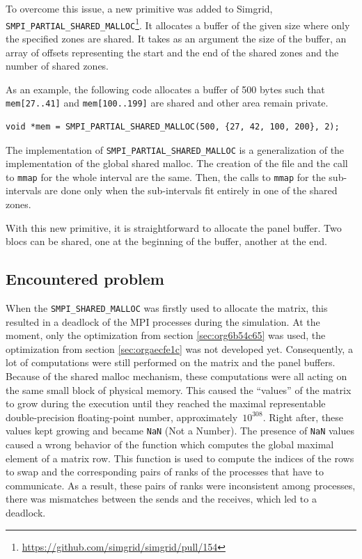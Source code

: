 \documentclass[12pt, a4paper]{memoir}
\begin{document}
To overcome this issue, a new primitive was added to Simgrid,
\texttt{SMPI\_PARTIAL\_SHARED\_MALLOC}\footnote{\url{https://github.com/simgrid/simgrid/pull/154}}. It allocates a buffer of the given size where only the
specified zones are shared. It takes as an argument the size of the buffer, an array of offsets representing the
start and the end of the shared zones and the number of shared zones.

As an example, the following code allocates a buffer of 500 bytes such that \texttt{mem[27..41]} and \texttt{mem[100..199]} are shared
and other area remain private.

\begin{verbatim}
void *mem = SMPI_PARTIAL_SHARED_MALLOC(500, {27, 42, 100, 200}, 2);
\end{verbatim}

The implementation of \texttt{SMPI\_PARTIAL\_SHARED\_MALLOC} is a generalization of the implementation of the global shared
malloc. The creation of the file and the call to \texttt{mmap} for the whole interval are the same. Then, the calls to \texttt{mmap}
for the sub-intervals are done only when the sub-intervals fit entirely in one of the shared zones.

With this new primitive, it is straightforward to allocate the panel buffer. Two blocs can be shared, one at the
beginning of the buffer, another at the end.
\subsection{Encountered problem}
\label{sec:org6164f4b}
When the \texttt{SMPI\_SHARED\_MALLOC} was firstly used to allocate the matrix, this resulted in a deadlock of the MPI
processes during the simulation. At the moment, only the optimization from section \ref{sec:org6b54c65} was used, the
optimization from section \ref{sec:orgaecfe1c} was not developed yet. Consequently, a lot of computations were still
performed on the matrix and the panel buffers. Because of the shared malloc mechanism, these computations were all
acting on the same small block of physical memory. This caused the “values” of the matrix to grow during the
execution until they reached the maximal representable double-precision floating-point number,
approximately~\(10^{308}\).  Right after, these values kept growing and became \texttt{NaN} (Not a Number). The presence of \texttt{NaN}
values caused a wrong behavior of the function which computes the global maximal element of a matrix row. This
function is used to compute the indices of the rows to swap and the corresponding pairs of ranks of the processes
that have to communicate. As a result, these pairs of ranks were inconsistent among processes, there was mismatches
between the sends and the receives, which led to a deadlock.
\end{document}
